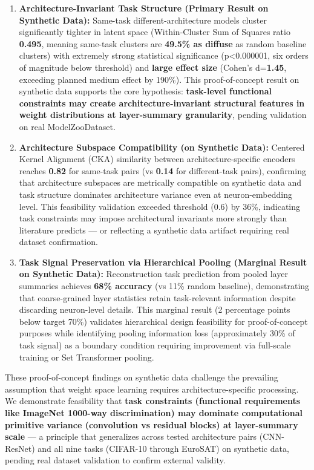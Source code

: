 \begin{enumerate}
\item \textbf{Architecture-Invariant Task Structure (Primary Result on Synthetic Data):} Same-task different-architecture models cluster significantly tighter in latent space (Within-Cluster Sum of Squares ratio \textbf{0.495}, meaning same-task clusters are \textbf{49.5\% as diffuse} as random baseline clusters) with extremely strong statistical significance (p<0.000001, six orders of magnitude below threshold) and \textbf{large effect size} (Cohen's d=\textbf{1.45}, exceeding planned medium effect by 190\%). This proof-of-concept result on synthetic data supports the core hypothesis: \textbf{task-level functional constraints may create architecture-invariant structural features in weight distributions at layer-summary granularity}, pending validation on real ModelZooDataset.

\item \textbf{Architecture Subspace Compatibility (on Synthetic Data):} Centered Kernel Alignment (CKA) similarity between architecture-specific encoders reaches \textbf{0.82} for same-task pairs (vs \textbf{0.14} for different-task pairs), confirming that architecture subspaces are metrically compatible on synthetic data and task structure dominates architecture variance even at neuron-embedding level. This feasibility validation exceeded threshold (0.6) by 36\%, indicating task constraints may impose architectural invariants more strongly than literature predicts --- or reflecting a synthetic data artifact requiring real dataset confirmation.

\item \textbf{Task Signal Preservation via Hierarchical Pooling (Marginal Result on Synthetic Data):} Reconstruction task prediction from pooled layer summaries achieves \textbf{68\% accuracy} (vs 11\% random baseline), demonstrating that coarse-grained layer statistics retain task-relevant information despite discarding neuron-level details. This marginal result (2 percentage points below target 70\%) validates hierarchical design feasibility for proof-of-concept purposes while identifying pooling information loss (approximately 30\% of task signal) as a boundary condition requiring improvement via full-scale training or Set Transformer pooling.
\end{enumerate}

These proof-of-concept findings on synthetic data challenge the prevailing assumption that weight space learning requires architecture-specific processing. We demonstrate feasibility that \textbf{task constraints (functional requirements like ImageNet 1000-way discrimination) may dominate computational primitive variance (convolution vs residual blocks) at layer-summary scale} --- a principle that generalizes across tested architecture pairs (CNN-ResNet) and all nine tasks (CIFAR-10 through EuroSAT) on synthetic data, pending real dataset validation to confirm external validity.

